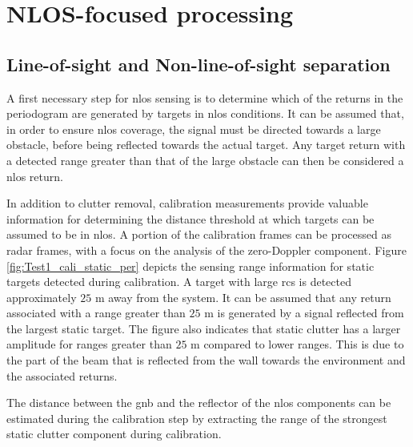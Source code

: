 	\section{NLOS-focused processing}
	\label{sec:nlos_proc_pipeline}
	
		\subsection{Line-of-sight and Non-line-of-sight separation}
		\label{sec:los_nlos_separation}
			
			A first necessary step for \gls{nlos} sensing is to determine which of the returns in the periodogram are generated by targets in \gls{nlos} conditions.
			It can be assumed that, in order to ensure \gls{nlos} coverage, the signal must be directed towards a large obstacle, before being reflected towards the actual target.
			Any target return with a detected range greater than that of the large obstacle can then be considered a \gls{nlos} return.
		
		
			In addition to clutter removal, calibration measurements provide valuable information for determining the distance threshold at which targets can be assumed to be in \gls{nlos}. 
			A portion of the calibration frames can be processed as radar frames, with a focus on the analysis of the zero-Doppler component.
			Figure \ref{fig:Test1_cali_static_per} depicts the sensing range information for static targets detected during calibration. 
			A target with large \gls{rcs} is detected approximately $25$ m away from the system. 
			It can be assumed that any return associated with a range greater than $25$ m is generated by a signal reflected from the largest static target.
			The figure also indicates that static clutter has a larger amplitude for ranges greater than $25$ m compared to lower ranges.
			This is due to the part of the beam that is reflected from the wall towards the environment and the associated returns.
			
			The distance between the \gls{gnb} and the reflector of the \gls{nlos} components can be estimated during the calibration step by extracting the range of the strongest static clutter component during calibration.
			
